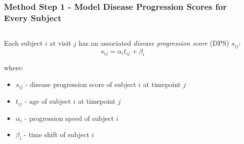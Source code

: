 \begin{frame}
\frametitle{Method Step 1 - Model Disease Progression Scores for Every Subject}

\begin{columns}[T]
    \begin{column}{.7\textwidth}
    
%       
% 
    
    
    \vspace{-2em}
   
    Each subject $i$ at visit $j$ has an associated \emph{disease progression score} (DPS) $s_{ij}$:
      $$s_{ij} = \alpha_i t_{ij} + \beta_i$$
      
      where:
      \begin{itemize}
       \item $s_{ij}$ - disease progression score of subject $i$ at timepoint $j$
       \item $t_{ij}$ - age of subject $i$ at timepoint $j$
       \item $\alpha_i $ - progression speed of subject $i$
       \item $\beta_i $ - time shift of subject $i$
      \end{itemize}
            
     

    \end{column}
    \hspace{-2em}
    \begin{column}{.25\textwidth}
    

\end{column}
\end{columns}
\end{frame}
